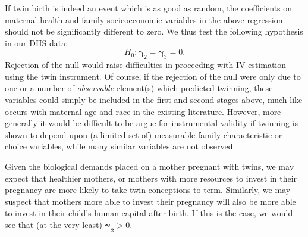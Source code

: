 If twin birth is indeed an event which is as good as random, the coefficients
on maternal health and family socieoeconomic variables in the above regression
should not be significantly different to zero.  We thus test the following 
hypothesis in our DHS data:
\begin{equation}
\label{TWINeqn:twintest}
H_0: \bm{\gamma}_2 = \bm{\gamma}_3 = 0.
\end{equation}
Rejection of the null would raise difficulties in proceeding with IV estimation 
using the twin instrument.  Of course, if the rejection of the null were only due 
to one or a number of \emph{observable} element(s) which predicted twinning, 
these variables could simply be included in the first and second stages above, 
much like occurs with maternal age and race in the existing literature.  However, 
more generally it would be difficult to be argue for instrumental validity if 
twinning is shown to depend upon (a limited set of) measurable family 
characteristic or choice variables, while many similar variables are not observed.

Given the biological demands placed on a mother pregnant with twins, we may 
expect that healthier mothers, or mothers with more resources to invest in their
pregnancy are more likely to take twin conceptions to term.  Similarly, we may
suspect that mothers more able to invest their pregnancy will also be more able
to invest in their child's human capital after birth.  If this is the case, we
would see that (at the very least) $\bm{\gamma_2}>0$.

